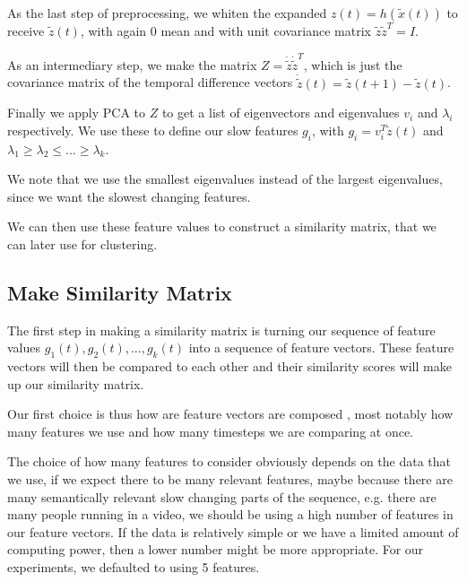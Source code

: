 As the last step of preprocessing, we whiten the expanded $z(t)=h(\tilde{x}(t))$ to receive $\tilde{z}(t)$, with again $0$ mean and with unit covariance matrix $\tilde{z}\tilde{z}^T=I$. 

As an intermediary step, we make the matrix $Z=\dot{\tilde{z}}\dot{\tilde{z}}^T$, which is just the covariance matrix of the temporal difference vectors $\dot{\tilde{z}}(t)=\tilde{z}(t+1)-\tilde{z}(t)$.

Finally we apply PCA  to $Z$ to get a list of eigenvectors and eigenvalues $v_i$ and $\lambda_i$ respectively. We use these to define our slow features $g_i$, with $g_i=v_i^T\tilde{z}(t)$ and $\lambda_1 \geq \lambda _2 \leq \ldots \geq \lambda_k$. 

We note that we use the smallest eigenvalues instead of the largest eigenvalues, since we want the slowest changing features.

We can then use these feature values to construct a similarity matrix, that we can later use for clustering.
\subsection{Make Similarity Matrix}
The first step in making a similarity matrix is turning our sequence of feature values $g_1(t),g_2(t),\ldots,g_k(t)$  into a sequence of feature vectors. These feature vectors will then be compared to each other and their similarity scores will make up our similarity matrix.

Our first choice is thus how are feature vectors are composed , most notably how many features we use and how many timesteps we are comparing at once.

The choice of how many features to consider obviously depends on the data that we use, if we expect there to be many relevant features, maybe because there are many semantically relevant slow changing parts of the sequence, e.g. there are many people running in a video, we should be using a high number of features in our feature vectors. If the data is relatively simple or we have a limited amount of computing power, then a lower number might be more appropriate.  For our experiments, we defaulted to using 5 features. 


